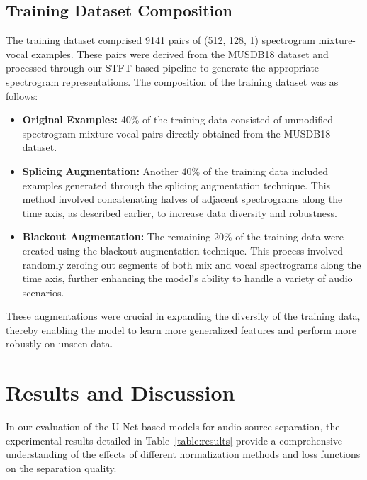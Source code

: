\documentclass[conference]{IEEEtran}
\begin{document}
\subsection{Training Dataset Composition}

The training dataset comprised 9141 pairs of (512, 128, 1) spectrogram mixture-vocal examples. These pairs were derived from the MUSDB18 dataset and processed through our STFT-based pipeline to generate the appropriate spectrogram representations. The composition of the training dataset was as follows:

\begin{itemize}
    \item \textbf{Original Examples:} 40\% of the training data consisted of unmodified spectrogram mixture-vocal pairs directly obtained from the MUSDB18 dataset.
    \item \textbf{Splicing Augmentation:} Another 40\% of the training data included examples generated through the splicing augmentation technique. This method involved concatenating halves of adjacent spectrograms along the time axis, as described earlier, to increase data diversity and robustness.
    \item \textbf{Blackout Augmentation:} The remaining 20\% of the training data were created using the blackout augmentation technique. This process involved randomly zeroing out segments of both mix and vocal spectrograms along the time axis, further enhancing the model's ability to handle a variety of audio scenarios.
\end{itemize}

These augmentations were crucial in expanding the diversity of the training data, thereby enabling the model to learn more generalized features and perform more robustly on unseen data.


\section{Results and Discussion}

In our evaluation of the U-Net-based models for audio source separation, the experimental results detailed in Table~\ref{table:results} provide a comprehensive understanding of the effects of different normalization methods and loss functions on the separation quality.
\end{document}
